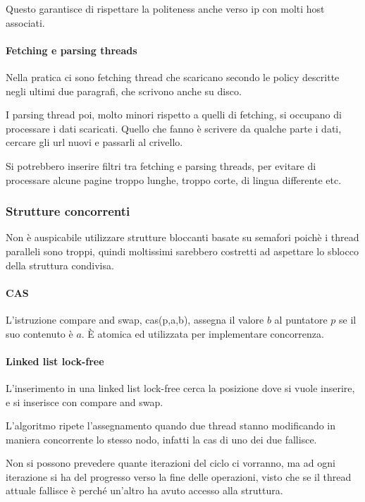 Questo garantisce di rispettare la politeness anche verso ip con molti 
host associati.

\paragraph{Fetching e parsing threads}
Nella pratica ci sono fetching thread che scaricano secondo le policy descritte 
negli ultimi due paragrafi, che scrivono anche su disco.

I parsing thread poi, molto minori rispetto a quelli di fetching, 
si occupano di processare i dati scaricati.
Quello che fanno è scrivere da qualche parte i dati, cercare gli 
url nuovi e passarli al crivello.

\begin{remark}
    Si potrebbero inserire filtri tra fetching e parsing threads, per evitare 
    di processare alcune pagine troppo lunghe, troppo corte, di lingua differente etc.
\end{remark}

\subsubsection{Strutture concorrenti}

Non è auspicabile utilizzare strutture bloccanti basate su semafori poichè i thread 
paralleli sono troppi, quindi moltissimi sarebbero costretti ad aspettare lo 
sblocco della struttura condivisa.

\paragraph{CAS}
L'istruzione compare and swap, cas(p,a,b), assegna il valore $b$ al puntatore $p$ se il suo contenuto è $a$. È atomica ed utilizzata per implementare concorrenza.

\paragraph{Linked list lock-free}
L'inserimento in una linked list lock-free cerca la posizione dove si vuole inserire, e si inserisce con compare and swap.

L'algoritmo ripete l'assegnamento quando due thread stanno modificando in maniera 
concorrente lo stesso nodo, infatti la cas di uno dei due fallisce.

Non si possono prevedere quante iterazioni del ciclo ci vorranno, ma ad ogni 
iterazione si ha del progresso verso la fine delle operazioni, visto che se il thread 
attuale fallisce è perché un'altro ha avuto accesso alla struttura.

